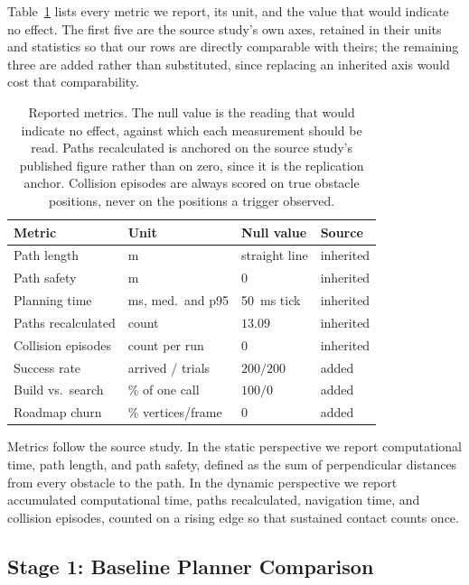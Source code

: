 Table~\ref{tab:metrics} lists every metric we report, its unit, and the
value that would indicate no effect. The first five are the source study's own
axes, retained in their units and statistics so that our rows are directly
comparable with theirs; the remaining three are added rather than substituted,
since replacing an inherited axis would cost that comparability.

\begin{table}[t]
\centering
\small
\begin{tabular}{llll}
\hline
Metric & Unit & Null value & Source \\
\hline
Path length          & m                & straight line   & inherited \\
Path safety          & m                & $0$             & inherited \\
Planning time        & ms, med.\ and p95 & 50~ms tick      & inherited \\
Paths recalculated   & count            & $13.09$         & inherited \\
Collision episodes   & count per run    & $0$             & inherited \\
Success rate         & arrived / trials & $200/200$       & added \\
Build vs.\ search    & \% of one call   & $100/0$         & added \\
Roadmap churn        & \% vertices/frame & $0$            & added \\
\hline
\end{tabular}
\caption{Reported metrics. The null value is the reading that would indicate no
effect, against which each measurement should be read. Paths recalculated is
anchored on the source study's published figure rather than on zero, since it
is the replication anchor. Collision episodes are always scored on true
obstacle positions, never on the positions a trigger observed.}
\label{tab:metrics}
\end{table}

Metrics follow the source study. In the static perspective we report
computational time, path length, and path safety, defined as the sum of
perpendicular distances from every obstacle to the path. In the dynamic
perspective we report accumulated computational time, paths recalculated,
navigation time, and collision episodes, counted on a rising edge so that
sustained contact counts once.

\subsection{Stage 1: Baseline Planner Comparison}
\label{sec:stage1}

